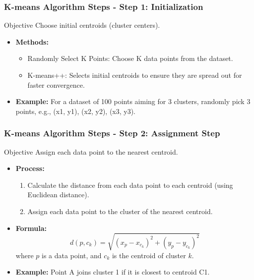 \documentclass[aspectratio=169]{beamer}
\begin{document}
\begin{frame}[fragile]
    \frametitle{K-means Algorithm Steps - Step 1: Initialization}
    \begin{block}{Objective}
        Choose initial centroids (cluster centers).
    \end{block}
    \begin{itemize}
        \item \textbf{Methods:}
        \begin{itemize}
            \item Randomly Select K Points: Choose K data points from the dataset.
            \item K-means++: Selects initial centroids to ensure they are spread out for faster convergence.
        \end{itemize}
        \item \textbf{Example:} For a dataset of 100 points aiming for 3 clusters, randomly pick 3 points, e.g., (x1, y1), (x2, y2), (x3, y3).
    \end{itemize}
\end{frame}

\begin{frame}[fragile]
    \frametitle{K-means Algorithm Steps - Step 2: Assignment Step}
    \begin{block}{Objective}
        Assign each data point to the nearest centroid.
    \end{block}
    \begin{itemize}
        \item \textbf{Process:}
        \begin{enumerate}
            \item Calculate the distance from each data point to each centroid (using Euclidean distance).
            \item Assign each data point to the cluster of the nearest centroid.
        \end{enumerate}
        \item \textbf{Formula:}
        \begin{equation}
            d(p, c_k) = \sqrt{(x_p - x_{c_k})^2 + (y_p - y_{c_k})^2}
        \end{equation}
        where \( p \) is a data point, and \( c_k \) is the centroid of cluster \( k \).
        \item \textbf{Example:} Point A joins cluster 1 if it is closest to centroid C1.
    \end{itemize}
\end{frame}
\end{document}
